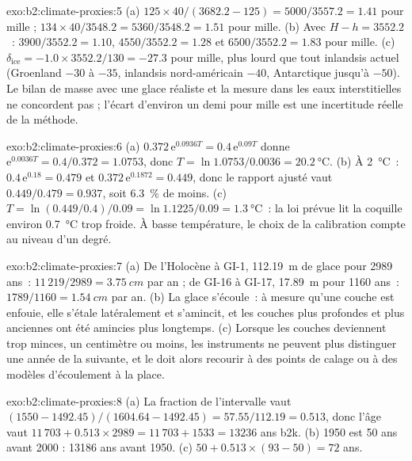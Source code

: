 \begin{solution}{exo:b2:climate-proxies:5}
(a) $125 \times 40/(3682.2 - 125) = 5000/3557.2 = 1.41$ pour mille ; $134 \times 40/3548.2 =
5360/3548.2 = 1.51$ pour mille. (b) Avec $H - h = 3552.2$~: $3900/3552.2 = 1.10$, $4550/3552.2 = 1.28$
et $6500/3552.2 = 1.83$ pour mille. (c) $\delta_{\mathrm{ice}} = -1.0 \times 3552.2/130 = -27.3$ pour
mille, plus lourd que tout inlandsis actuel (Groenland $-30$ à $-35$, inlandsis nord-américain
$-40$, Antarctique jusqu'à $-50$). Le bilan de masse avec une glace réaliste et la mesure dans les eaux interstitielles
ne concordent pas ; l'écart d'environ un demi pour mille est une incertitude réelle de la méthode.
\end{solution}

\begin{solution}{exo:b2:climate-proxies:6}
(a) $0.372\,\mathrm{e}^{0.0936T} = 0.4\,\mathrm{e}^{0.09T}$ donne $\mathrm{e}^{0.0036T} =
0.4/0.372 = 1.0753$, donc $T = \ln 1.0753/0.0036 = \qty{20.2}{\celsius}$. (b) À
\qty{2}{\celsius}~: $0.4\,\mathrm{e}^{0.18} = 0.479$ et $0.372\,\mathrm{e}^{0.1872} = 0.449$, donc le rapport
ajusté vaut $0.449/0.479 = 0.937$, soit \qty{6.3}{\percent} de moins. (c) $T = \ln(0.449/0.4)/0.09 =
\ln 1.1225/0.09 = \qty{1.3}{\celsius}$~: la loi prévue lit la coquille environ
\qty{0.7}{\celsius} trop froide. À basse température, le choix de la calibration compte au niveau d'un
degré.
\end{solution}

\begin{solution}{exo:b2:climate-proxies:7}
(a) De l'Holocène à GI-1, \qty{112.19}{m} de glace pour 2989 ans~: $11\,219/2989 =
\qty{3.75}{cm}$ par an ; de GI-16 à GI-17, \qty{17.89}{m} pour 1160 ans~: $1789/1160 =
\qty{1.54}{cm}$ par an. (b) La glace
s'écoule~: à mesure qu'une couche est enfouie, elle s'étale latéralement et s'amincit, et les couches plus profondes et plus anciennes
ont été amincies plus longtemps. (c) Lorsque les couches deviennent trop minces, un centimètre ou moins, les instruments
ne peuvent plus distinguer une année de la suivante, et le  doit alors recourir à des points de calage ou à des modèles d'écoulement
à la place.
\end{solution}

\begin{solution}{exo:b2:climate-proxies:8}
(a) La fraction de l'intervalle vaut $(1550 - 1492.45)/(1604.64 - 1492.45) = 57.55/112.19 = 0.513$,
donc l'âge vaut $11\,703 + 0.513 \times 2989 = 11\,703 + 1533 = \num{13236}$ ans b2k. (b) 1950 est 50
ans avant 2000 : \num{13186} ans avant 1950. (c) $50 + 0.513 \times (93 - 50) = 72$ ans.
\end{solution}

